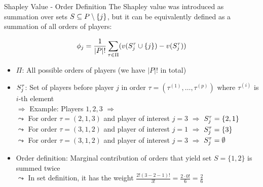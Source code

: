 \documentclass[11pt,compress,t,notes=noshow, aspectratio=169, xcolor=table]{beamer}
\begin{document}
\begin{frame}{Shapley Value - Order Definition}
The Shapley value was introduced as summation over sets $\SsubPnoj$, but it can be equivalently defined as a summation of all orders of players: 

$$\phi_j = \frac{1}{|P|!} \sum_{\tau \in \Pi} (v(\Stau \cup \{j\}) - v(\Stau))$$
  
\begin{itemize}[<+->]
  \item $\Pi$: All possible orders of players (we have $|P|!$ in total)
  \item $\Stau$: Set of players before player $j$ in order $\tau = (\tau^{(1)}, \dots, \tau^{(p)})$  where $\tau^{(i)}$ is $i$-th element \\ %
  $\Rightarrow$ Example: Players $1,2,3$ $\Rightarrow$ 
  \\
  \phantom{$\Rightarrow$} $\leadsto$ For order $\tau = (2,1,3)$ and player of interest $j=3$ $\Rightarrow$ $\Stau = \{2, 1\}$\\
  \phantom{$\Rightarrow$} $\leadsto$ For order $\tau = (3,1,2)$ and player of interest $j=1$ $\Rightarrow$ $\Stau = \{3\}$\\
  \phantom{$\Rightarrow$} $\leadsto$ For order $\tau = (3,1,2)$ and player of interest $j=3$ $\Rightarrow$ $\Stau = \emptyset$
  \item Order definition: Marginal contribution of orders that yield set {\color{red} $S = \{1,2\}$} is summed twice\\
  $\leadsto$ In set definition, it has the weight $\tfrac{2! (3 - 2 - 1)!}{3!} = \tfrac{2 \cdot 0!}{6} = \tfrac{2}{6}$
\end{itemize}

\end{frame}
\end{document}
